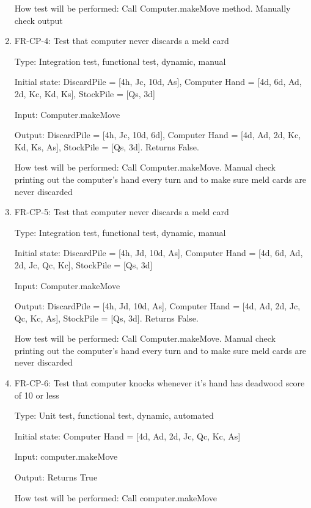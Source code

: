 \documentclass[12pt, titlepage]{article}
\begin{document}
\begin{enumerate}
    How test will be performed: Call Computer.makeMove method. Manually check output
    
    \item{FR-CP-4: Test that computer never discards a meld card\\}
    
    Type: Integration test, functional test, dynamic, manual 
    					
    Initial state: DiscardPile = [4h, Jc, 10d, As], Computer Hand = [4d, 6d, Ad, 2d, Kc, Kd, Ks], StockPile = [Qs, 3d]

    Input: Computer.makeMove
    
    Output: DiscardPile = [4h, Jc, 10d, 6d], Computer Hand = [4d, Ad, 2d, Kc, Kd, Ks, As], StockPile = [Qs, 3d]. Returns False.
    					
    How test will be performed: Call Computer.makeMove. Manual check printing out the computer's hand every turn and to make sure meld cards are never discarded

    \item{FR-CP-5: Test that computer never discards a meld card\\}
    
    Type: Integration test, functional test, dynamic, manual 
    					
    Initial state: DiscardPile = [4h, Jd, 10d, As], Computer Hand = [4d, 6d, Ad, 2d, Jc, Qc, Kc], StockPile = [Qs, 3d]

    Input: Computer.makeMove
    
    Output: DiscardPile = [4h, Jd, 10d, As], Computer Hand = [4d, Ad, 2d, Jc, Qc, Kc, As], StockPile = [Qs, 3d]. Returns False.
    					
    How test will be performed: Call Computer.makeMove. Manual check printing out the computer's hand every turn and to make sure meld cards are never discarded
    
    \item{FR-CP-6: Test that computer knocks whenever it's hand has deadwood score of 10 or less\\}
    
    Type: Unit test, functional test, dynamic, automated 
    					
    Initial state: Computer Hand = [4d, Ad, 2d, Jc, Qc, Kc, As]
    
    Input: computer.makeMove
    
    Output: Returns True
    
    How test will be performed: Call computer.makeMove

\end{enumerate}
\end{document}
